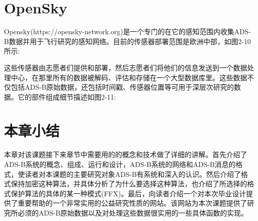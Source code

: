 \section{OpenSky}
Opensky(https://opensky-network.org)是一个专门的在它的感知范围内收集ADS-B数据并用于飞行研究的感知网络。目前的传感器部署范围是欧洲中部，如图2-10所示:


这些传感器由志愿者们提供和部署，然后志愿者们将他们的信息发送到一个数据处理中心，在那里所有的数据被解码、评估和存储在一个大型数据库里。这些数据不仅包括ADS-B原始数据，还包括时间戳、传感器位置等可用于深层次研究的数据。它的部件组成细节描述如图2-11:

\section{本章小结}
本章对该课题接下来章节中需要用的的概念和技术做了详细的讲解。首先介绍了ADS-B系统的概念、组成、运行和设计，ADS-B系统的网络和ADS-B消息的格式，使读者对本课题的主要研究对象ADS-B有系统和深入的认识。然后介绍了格式保持加密这种算法，并具体分析了为什么要选择这种算法，也介绍了所选择的格式保护算法的具体的某一种模式(FFX)。最后，向读者介绍一个对本次毕业设计提供了重要帮助的一个非常实用的公益研究性质的网站。该网站为本次课题提供了研究所必须的ADS-B原始数据以及对处理这些数据很实用的一些具体函数的实现。
